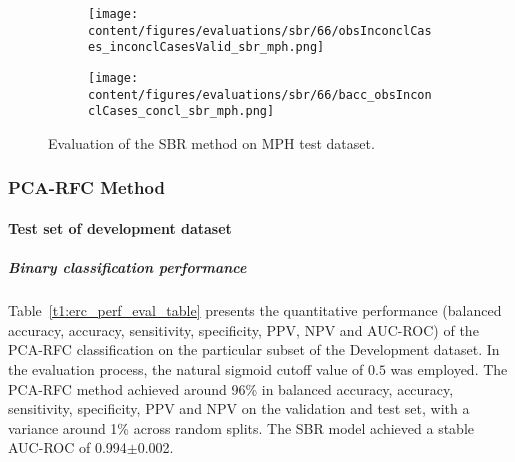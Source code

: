 \begin{figure}[ht]
  \begin{subfigure}{0.49\textwidth}
    \centering
    \texttt{[image: content/figures/evaluations/sbr/66/obsInconclCases\_inconclCasesValid\_sbr\_mph.png]}
    \label{fig:obsInconclCases_inconclCasesValid_sbr_mph}
  \end{subfigure}
  \hfill
  \begin{subfigure}{0.49\textwidth}
    \centering
    \texttt{[image: content/figures/evaluations/sbr/66/bacc\_obsInconclCases\_concl\_sbr\_mph.png]}
    \label{fig:bacc_obsInconclCases_concl_sbr_mph}
  \end{subfigure}
  \caption{Evaluation of the SBR method on MPH test dataset.}
  \label{fig:perf_results_sbr_mph}
\end{figure}




\subsubsection{PCA-RFC Method}
\label{subsubsec:eval_rfc}


\paragraph{Test set of development dataset}


\subparagraph{Binary classification performance}


Table~\ref{t1:erc_perf_eval_table} presents the quantitative performance 
(balanced accuracy, accuracy, sensitivity, specificity, PPV, NPV and AUC-ROC) of the PCA-RFC classification on the 
particular subset of the Development dataset.
In the evaluation process, the natural sigmoid cutoff value of $0.5$ was employed.
The PCA-RFC method achieved around 96\% in balanced accuracy, accuracy, sensitivity, specificity, PPV and NPV 
on the validation and test set, with a variance around 1\% across random splits.
The SBR model achieved a stable AUC-ROC of 0.994$\pm$0.002.


